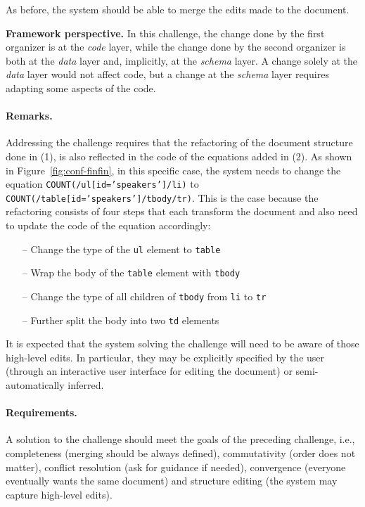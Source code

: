 \documentclass[english,submission]{programming}
\DeclareRobustCommand{\frameworkbox}[2][gray!15]{
\begin{tcolorbox}[breakable,left=3pt,right=3pt,top=3pt,bottom=3pt,colback=#1,colframe=#1,parbox=false,
  width=\dimexpr\textwidth\relax,enlarge left by=0mm,boxsep=5pt,arc=0pt,enlarge top by=0.5em,%
  outer arc=0pt]\setlength{\parskip}{0.5em}\setlength{\parindent}{0em}\textbf{\sffamily Framework perspective.}\quad #2
\end{tcolorbox}}
\begin{document}
\noindent
As before, the system should be able to merge the edits made to the document.

\frameworkbox{
In this challenge, the change done by the first organizer is at the \emph{code} layer, while
the change done by the second organizer is both at the \emph{data} layer and, implicitly,
at the \emph{schema} layer. A change solely at the \emph{data} layer would not affect code,
but a change at the \emph{schema} layer requires adapting some aspects of the code.
}

\paragraph{Remarks.}
Addressing the challenge requires that the refactoring of the document structure done in (1),
is also reflected in the code of the equations added in (2). As shown in
Figure~\ref{fig:conf-finfin}, in this specific case, the system needs to change the equation
\texttt{COUNT(/ul[id='speakers']/li)} to \texttt{COUNT(/table[id='speakers']/tbody/tr)}.
This is the case because the refactoring consists of four steps that each transform the
document and also need to update the code of the equation accordingly:

\begin{itemize}
    \item[--] Change the type of the \texttt{ul} element to \texttt{table}
    \item[--] Wrap the body of the \texttt{table} element with \texttt{tbody}
    \item[--] Change the type of all children of \texttt{tbody} from \texttt{li} to \texttt{tr}
    \item[--] Further split the body into two \texttt{td} elements
\end{itemize}

\noindent
It is expected that the system solving the challenge will need to be aware of those high-level
edits. In particular, they may be explicitly specified by the user (through an interactive
user interface for editing the document) or semi-automatically inferred.

\paragraph{Requirements.}
A solution to the challenge should meet the goals of the preceding challenge, i.e., completeness
(merging should be always defined), commutativity (order does not matter), conflict resolution
(ask for guidance if needed), convergence (everyone eventually wants the same document) and
structure editing (the system may capture high-level edits).
\end{document}
